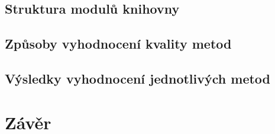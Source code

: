 
\blindtext

\section{Struktura modulů knihovny}
\label{sec:modules}


\blindtext

\blindtext

\blindtext

\section{Způsoby vyhodnocení kvality metod}
\label{sec:method-quality}


\blindtext

\blindtext

\blindtext

\section{Výsledky vyhodnocení jednotlivých metod}
\label{sec:method-evaluation}


\blindtext

\blindtext

\blindtext


\chapter{Závěr}
\label{cha:conclusion}

\blindtext

\blindtext

\blindtext
